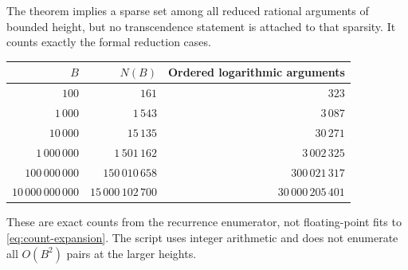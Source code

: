 The theorem implies a sparse set among all reduced rational arguments
of bounded height, but no transcendence statement is attached to that
sparsity. It counts exactly the formal reduction cases.

\begin{center}
\begin{tabular}{r r r}
\toprule
$B$ & $N(B)$ & Ordered logarithmic arguments\\
\midrule
$100$ & $161$ & $323$\\
$1\,000$ & $1\,543$ & $3\,087$\\
$10\,000$ & $15\,135$ & $30\,271$\\
$1\,000\,000$ & $1\,501\,162$ & $3\,002\,325$\\
$100\,000\,000$ & $150\,010\,658$ & $300\,021\,317$\\
$10\,000\,000\,000$ & $15\,000\,102\,700$ & $30\,000\,205\,401$\\
\bottomrule
\end{tabular}
\end{center}
These are exact counts from the recurrence enumerator, not floating-point
fits to \eqref{eq:count-expansion}. The script uses integer arithmetic
and does not enumerate all $O(B^2)$ pairs at the larger heights.
